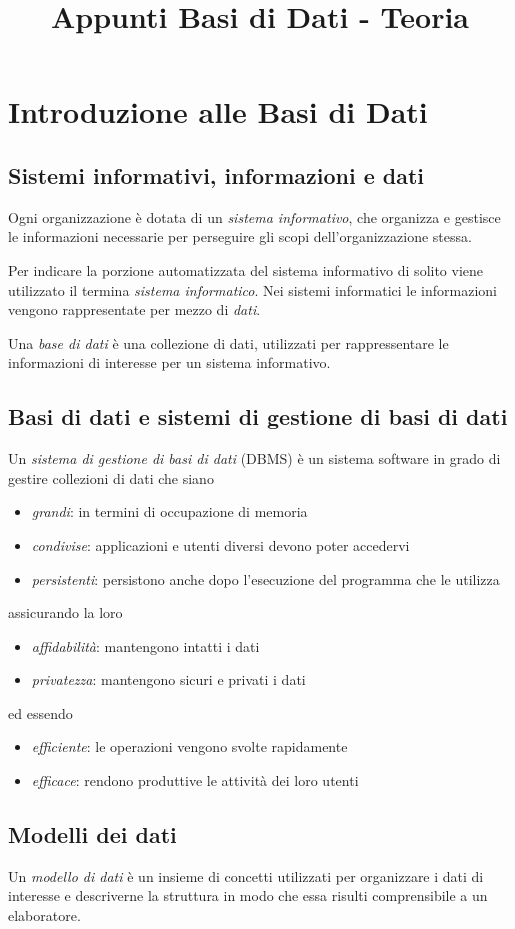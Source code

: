 \documentclass[11pt]{book}
\title{Appunti Basi di Dati - Teoria}
\begin{document}
\chapter{Introduzione alle Basi di Dati}
\section{Sistemi informativi, informazioni e dati}
Ogni organizzazione è dotata di un \textit{sistema informativo}, che organizza e gestisce le informazioni necessarie per 
perseguire gli scopi dell'organizzazione stessa.

Per indicare la porzione automatizzata del sistema informativo di solito viene utilizzato il termina \textit{sistema informatico}.
Nei sistemi informatici le informazioni vengono rappresentate per mezzo di \textit{dati}.

Una \textit{base di dati} è una collezione di dati, utilizzati per rappressentare le informazioni di interesse per un 
sistema informativo.
\section{Basi di dati e sistemi di gestione di basi di dati}
Un \textit{sistema di gestione di basi di dati} (DBMS) è un sistema software in grado di gestire collezioni di dati che 
siano 
\begin{itemize}
    \item \textit{grandi}: in termini di occupazione di memoria
    \item \textit{condivise}: applicazioni e utenti diversi devono poter accedervi
    \item \textit{persistenti}: persistono anche dopo l'esecuzione del programma che le utilizza
\end{itemize}
assicurando la loro
\begin{itemize}
    \item \textit{affidabilità}: mantengono intatti i dati 
    \item \textit{privatezza}: mantengono sicuri e privati i dati
\end{itemize}
ed essendo
\begin{itemize}
    \item \textit{efficiente}: le operazioni vengono svolte rapidamente
    \item \textit{efficace}: rendono produttive le attività dei loro utenti
\end{itemize}
\section{Modelli dei dati}
Un \textit{modello di dati} è un insieme di concetti utilizzati per organizzare i dati di interesse e descriverne la 
struttura in modo che essa risulti comprensibile a un elaboratore.
\end{document}
